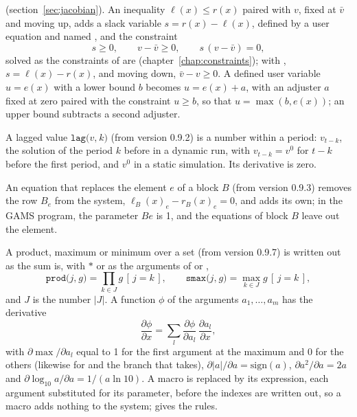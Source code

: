 (section~\ref{sec:jacobian}).
An inequality $\ell(x) \le r(x)$ paired with $v$, fixed at $\bar v$ and moving
up, adds a slack variable $s = r(x) - \ell(x)$, defined by a user equation and
named , and the constraint
\begin{equation*}
s \ge 0, \qquad v - \bar v \ge 0, \qquad s\,(v - \bar v) = 0,
\end{equation*}
solved as the constraints of  are
(chapter~\ref{chap:constraints}); with , $s = \ell(x) - r(x)$, and
moving down, $\bar v - v \ge 0$. A defined user variable $u = e(x)$ with a
lower bound $b$ becomes $u = e(x) + a$, with an adjuster $a$ fixed at zero
paired with the constraint $u \ge b$, so that $u = \max(b, e(x))$; an upper
bound subtracts a second adjuster.

A lagged value $\texttt{lag(}v\texttt{,}\ k\texttt{)}$ (from version 0.9.2) is a
number within a period: $v_{t-k}$, the solution of the period $k$ before in a
dynamic run, with $v_{t-k} = v^0$ for $t - k$ before the first period, and $v^0$
in a static simulation. Its derivative is zero.

An equation that replaces the element $e$ of a block $B$ (from version 0.9.3)
removes the row $B_e$ from the system, $\ell_B(x)_e - r_B(x)_e = 0$, and adds its
own; in the GAMS program, the parameter $B$\cmd{, }$e$\cmd{)} is 1, and
the equations of block $B$ leave out the element.

A product, maximum or minimum over a set (from version 0.9.7) is written out
as the sum is, with $*$ or as the arguments of  or ,
\begin{equation*}
\texttt{prod(}j\texttt{,}\ g\texttt{)} = \prod_{k \in J} g\,[\,j = k\,], \qquad
\texttt{smax(}j\texttt{,}\ g\texttt{)} = \max_{k \in J} g\,[\,j = k\,],
\end{equation*}
and $J$\cmd{)} is the number $|J|$. A function $\phi$ of the
arguments $a_1, \dots, a_m$ has the derivative
\begin{equation*}
\frac{\partial \phi}{\partial x} = \sum_{l} \frac{\partial \phi}{\partial a_l}\,\frac{\partial a_l}{\partial x},
\end{equation*}
with $\partial \max / \partial a_l$ equal to 1 for the first argument at the
maximum and 0 for the others (likewise for  and the branch that
 takes), $\partial |a| / \partial a = \mathrm{sign}(a)$,
$\partial a^2 / \partial a = 2a$ and $\partial \log_{10} a / \partial a = 1 /
(a \ln 10)$. A macro is replaced by its expression, each argument substituted
for its parameter, before the indexes are written out, so a macro adds nothing
to the system;  gives the rules.

